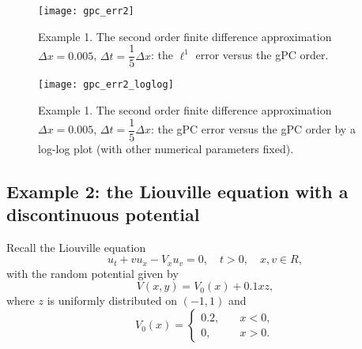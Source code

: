 \documentclass[12pt]{article}
\theoremstyle{plain}
\theoremstyle{remark}
\theoremstyle{remark}
\theoremstyle{remark}
\numberwithin{equation}{section}
\newcommand{\Dx}{\Delta x}
\newcommand{\Dt}{\Delta t}
\begin{document}
\begin{figure}[htbp]
  \centering
  \texttt{[image: gpc\_err2]}
  \caption{Example 1. The second order finite difference approximation $\Dx=0.005$, $\Dt=\dfrac{1}{5}\Dx$: the 
  $\ell^1$ error versus the gPC order.}
  \label{mverr2}
\end{figure}

\begin{figure}[htbp]
  \centering
  \texttt{[image: gpc\_err2\_loglog]}
  \caption{Example 1. The second order finite difference approximation $\Dx=0.005$, $\Dt=\dfrac{1}{5}\Dx$: the gPC error versus the gPC order by a log-log plot
(with other numerical parameters fixed).}
  \label{mverrlog2}
\end{figure}


\subsection{Example 2: the Liouville equation with a discontinuous potential}

Recall the Liouville equation
\begin{equation}
  u_t+v u_x-V_x u_v=0, \quad t>0, \quad x,v\in R,
\end{equation}
with the random potential given by
\begin{equation}
  V(x,y)=V_0(x)+0.1xz,
\end{equation}
where $z$ is uniformly distributed on $(-1,1)$ and 
\begin{equation}
  V_0(x)=
  \begin{cases}
    0.2, \quad &x<0, \\
    0, \quad &x>0.
  \end{cases}
\end{equation}
\end{document}
